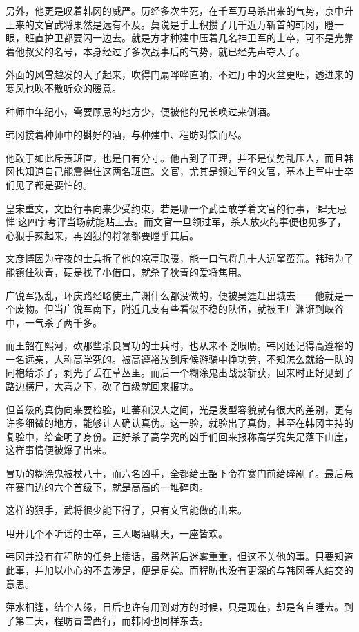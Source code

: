 另外，他更是叹着韩冈的威严。历经多次生死，在千军万马杀出来的气势，京中升上来的文官武将果然是远有不及。莫说是手上积攒了几千近万斩首的韩冈，瞪一眼，班直护卫都要闪一边去。就是方才种建中压着几名神卫军的士卒，可不是光靠着他叔父的名号，本身经过了多次战事后的气势，就已经先声夺人了。

外面的风雪越发的大了起来，吹得门扇哗哗直响，不过厅中的火盆更旺，透进来的寒风也吹不散听众的暖意。

种师中年纪小，需要顾忌的地方少，便被他的兄长唤过来倒酒。

韩冈接着种师中的斟好的酒，与种建中、程昉对饮而尽。

他敢于如此斥责班直，也是自有分寸。他占到了正理，并不是仗势乱压人，而且韩冈也知道自己能震得住这两名班直。文官，尤其是领过军的文官，基本上军中士卒们见了都是要怕的。

皇宋重文，文臣行事向来少受约束，若是哪一个武臣敢学着文官的行事，‘肆无忌惮’这四字考评当场就能贴上去。而文官一旦领过军，杀人放火的事便也见多了，心狠手辣起来，再凶狠的将领都要瞠乎其后。

文彦博因为守夜的士兵拆了他的凉亭取暖，能一口气将几十人远窜蛮荒。韩琦为了能镇住狄青，硬是找了小借口，就杀了狄青的爱将焦用。

广锐军叛乱，环庆路经略使王广渊什么都没做的，便被吴逵赶出城去——他就是一个废物。但当广锐军南下，附近几支有些看似不稳的队伍，就被王广渊诳到峡谷中，一气杀了两千多。

而王韶在熙河，砍那些杀良冒功的士兵时，也从来不眨眼睛。韩冈还记得高遵裕的一名远亲，人称高学究的。被高遵裕放到斥候游骑中挣功劳，不知怎么就给一队的同袍给杀了，剥光了丢在草丛里。而后一个糊涂鬼出战没斩获，回来时正好见到了路边横尸，大喜之下，砍了首级就回来报功。

但首级的真伪向来要检验，吐蕃和汉人之间，光是发型容貌就有很大的差别，更有许多细微的地方，能够让人确认真伪。这一验，就验出了真伪，甚至在韩冈主持的复验中，给查明了身份。正好杀了高学究的凶手们回来报称高学究失足落下山崖，这样事情便被爆了出来。

冒功的糊涂鬼被杖八十，而六名凶手，全都给王韶下令在寨门前给碎剐了。最后悬在寨门边的六个首级下，就是高高的一堆碎肉。

这样的狠手，武将很少能下得了，只有文官能做的出来。

甩开几个不听话的士卒，三人喝酒聊天，一座皆欢。

韩冈并没有在程昉的任务上插话，虽然背后迷雾重重，但这不关他的事。只要知道此事，并加以小心的不去涉足，便是足矣。而程昉也没有更深的与韩冈等人结交的意思。

萍水相逢，结个人缘，日后也许有用到对方的时候，只是现在，却是各自睡去。到了第二天，程昉冒雪西行，而韩冈也同样东去。

